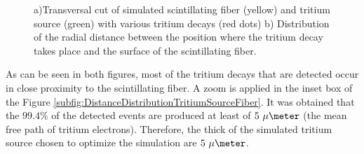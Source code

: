 \begin{figure}[h]
 \centering
 \caption{a)Transversal cut of simulated scintillating fiber (yellow) and tritium source (green) with various tritium decays (red dots) b) Distribution of the radial distance between the position where the tritium decay takes place and the surface of the scintillating fiber.}
 \label{fig:TritiumSourceSimulated}
\end{figure}	

As can be seen in both figures, most of the tritium decays that are detected occur in close proximity to the scintillating fiber.  A zoom is applied in the inset box of the Figure \ref{subfig:DistanceDistributionTritiumSourceFiber}. It was obtained that the $99.4\%$ of the detected events are produced at least of $5~\mu\meter$ (the mean free path of tritium electrons). Therefore, the thick of the simulated tritium source chosen to optimize the simulation are $5~\mu\meter$. 

